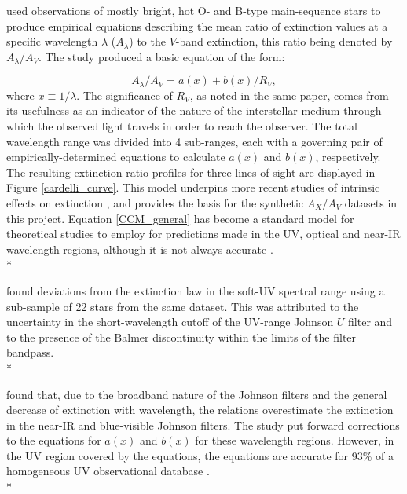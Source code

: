\documentclass[12pt, a4paper]{report}
\begin{document}
\cite{1989ApJ...345..245C} used observations of mostly bright, hot O- and B-type main-sequence stars to produce empirical equations describing the mean ratio of extinction values at a specific wavelength $\lambda$ ($A_{\lambda}$) to the $V$-band extinction, this ratio being denoted by $A_{\lambda}/A_{V}$. The study produced a basic equation of the form:

\begin{equation}
A_{\lambda}/A_{V} = a(x) + b(x)/R_{V},
\label{CCM_general}
\end{equation}
where $x \equiv 1/\lambda$. The significance of $R_{V}$, as noted in the same paper, comes from its usefulness as an indicator of the nature of the interstellar medium through which the observed light travels in order to reach the observer. The total wavelength range was divided into 4 sub-ranges, each with a governing pair of empirically-determined equations to calculate $a(x)$ and $b(x)$, respectively. The resulting extinction-ratio profiles for three lines of sight are displayed in Figure \ref{cardelli_curve}. This model underpins more recent studies of intrinsic effects on extinction \citep{2008PASP..120..583G,2014MNRAS.444..392C,2018MNRAS.475.5023C,2018MNRAS.479L.102C}, and provides the basis for the synthetic $A_{X}/A_{V}$ datasets in this project. Equation \ref{CCM_general} has become a standard model for theoretical studies to employ for predictions made in the UV, optical and near-IR wavelength regions, although it is not always accurate \citep{1994ApJ...422..158O,1999PASP..111...63F}. \\*

\cite{1994ApJ...422..158O} found deviations from the \cite{1989ApJ...345..245C} extinction law in the soft-UV spectral range using a sub-sample of 22 stars from the same dataset. This was attributed to the uncertainty in the short-wavelength cutoff of the UV-range Johnson $U$ filter and to the presence of the Balmer discontinuity within the limits of the filter bandpass.\\*

\cite{1999PASP..111...63F} found that, due to the broadband nature of the Johnson filters and the general decrease of extinction with wavelength, the \cite{1989ApJ...345..245C} relations overestimate the extinction in the near-IR and blue-visible Johnson filters. The study put forward corrections to the equations for $a(x)$ and $b(x)$ for these wavelength regions. However, in the UV region covered by  the \cite{1989ApJ...345..245C} equations, the equations are accurate for 93\% of a homogeneous UV observational database \citep{2004ApJ...616..912V}.\\*
\end{document}
